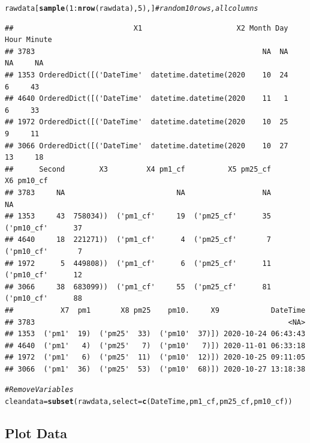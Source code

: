 \documentclass{article}\usepackage[]{graphicx}\usepackage[]{color}
\makeatletter
\newcommand{\hlnum}[1]{\textcolor[rgb]{0.686,0.059,0.569}{#1}}%
\newcommand{\hlcom}[1]{\textcolor[rgb]{0.678,0.584,0.686}{\textit{#1}}}%
\newcommand{\hlopt}[1]{\textcolor[rgb]{0,0,0}{#1}}%
\newcommand{\hlstd}[1]{\textcolor[rgb]{0.345,0.345,0.345}{#1}}%
\newcommand{\hlkwb}[1]{\textcolor[rgb]{0.69,0.353,0.396}{#1}}%
\newcommand{\hlkwc}[1]{\textcolor[rgb]{0.333,0.667,0.333}{#1}}%
\newcommand{\hlkwd}[1]{\textcolor[rgb]{0.737,0.353,0.396}{\textbf{#1}}}%
\newenvironment{kframe}{%
 \def\at@end@of@kframe{}%
 \ifinner\ifhmode%
  \def\at@end@of@kframe{\end{minipage}}%
  \begin{minipage}{\columnwidth}%
 \fi\fi%
 \def\FrameCommand##1{\hskip\@totalleftmargin \hskip-\fboxsep
 \colorbox{shadecolor}{##1}\hskip-\fboxsep
     \hskip-\linewidth \hskip-\@totalleftmargin \hskip\columnwidth}%
 \MakeFramed {\advance\hsize-\width
   \@totalleftmargin\z@ \linewidth\hsize
   \@setminipage}}%
 {\par\unskip\endMakeFramed%
 \at@end@of@kframe}
\newenvironment{knitrout}{}{} %
\makeatother
\begin{document}
\begin{knitrout}
\color{fgcolor}\begin{kframe}
\begin{alltt}
\hlstd{rawdata[}\hlkwd{sample}\hlstd{(}\hlnum{1}\hlopt{:}\hlkwd{nrow}\hlstd{(rawdata),} \hlnum{5}\hlstd{),]} \hlcom{# random 10 rows, all columns}
\end{alltt}
\begin{verbatim}
##                            X1                      X2 Month Day Hour Minute
## 3783                                                     NA  NA   NA     NA
## 1353 OrderedDict([('DateTime'  datetime.datetime(2020    10  24    6     43
## 4640 OrderedDict([('DateTime'  datetime.datetime(2020    11   1    6     33
## 1972 OrderedDict([('DateTime'  datetime.datetime(2020    10  25    9     11
## 3066 OrderedDict([('DateTime'  datetime.datetime(2020    10  27   13     18
##      Second        X3         X4 pm1_cf          X5 pm25_cf          X6 pm10_cf
## 3783     NA                          NA                  NA                  NA
## 1353     43  758034))  ('pm1_cf'     19  ('pm25_cf'      35  ('pm10_cf'      37
## 4640     18  221271))  ('pm1_cf'      4  ('pm25_cf'       7  ('pm10_cf'       7
## 1972      5  449808))  ('pm1_cf'      6  ('pm25_cf'      11  ('pm10_cf'      12
## 3066     38  683099))  ('pm1_cf'     55  ('pm25_cf'      81  ('pm10_cf'      88
##           X7  pm1       X8 pm25    pm10.     X9            DateTime
## 3783                                                           <NA>
## 1353  ('pm1'  19)  ('pm25'  33)  ('pm10'  37)]) 2020-10-24 06:43:43
## 4640  ('pm1'   4)  ('pm25'   7)  ('pm10'   7)]) 2020-11-01 06:33:18
## 1972  ('pm1'   6)  ('pm25'  11)  ('pm10'  12)]) 2020-10-25 09:11:05
## 3066  ('pm1'  36)  ('pm25'  53)  ('pm10'  68)]) 2020-10-27 13:18:38
\end{verbatim}
\begin{alltt}
\hlcom{# Remove Variables}
\hlstd{cleandata} \hlkwb{=} \hlkwd{subset}\hlstd{(rawdata,} \hlkwc{select}\hlstd{=}\hlkwd{c}\hlstd{(DateTime, pm1_cf, pm25_cf, pm10_cf))}
\end{alltt}
\end{kframe}
\end{knitrout}

\subsection{Plot Data}
\end{document}
